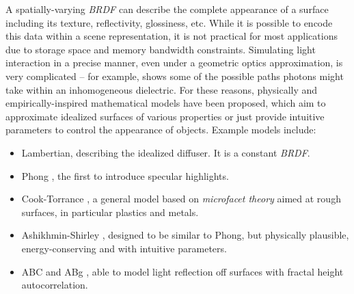 A spatially-varying \emph{BRDF} can describe the complete appearance of a surface including its texture, reflectivity, glossiness, etc. While it is possible to encode this data within a scene representation, it is not practical for most applications due to storage space and memory bandwidth constraints. Simulating light interaction in a precise manner, even under a geometric optics approximation, is very complicated -- for example,  shows some of the possible paths photons might take within an inhomogeneous dielectric. For these reasons, physically and empirically-inspired mathematical models have been proposed, which aim to approximate idealized surfaces of various properties or just provide intuitive parameters to control the appearance of objects. Example models include:
\begin{itemize}
\item Lambertian, describing the idealized diffuser. It is a constant \emph{BRDF}.
\item Phong \cite{Phong}, the first to introduce specular highlights.
\item Cook-Torrance \cite{CookTorrance}, a general model based on \emph{microfacet theory} aimed at rough surfaces, in particular plastics and metals.
\item Ashikhmin-Shirley \cite{Ashikhmin00ananisotropic}, designed to be similar to Phong, but physically plausible, energy-conserving and with intuitive parameters.
\item ABC and ABg \cite{opticalScattering}, able to model light reflection off surfaces with fractal height autocorrelation.
\end{itemize}

